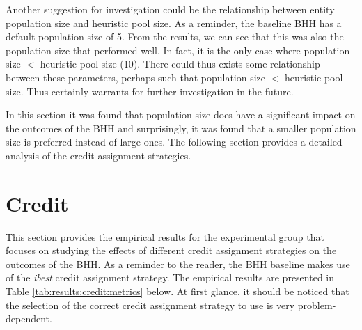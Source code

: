 Another suggestion for investigation could be the relationship between entity population size and heuristic pool size. As a reminder, the baseline \ac{BHH} has a default population size of 5. From the results, we can see that this was also the population size that performed well. In fact, it is the only case where population size $<$ heuristic pool size (10). There could thus exists some relationship between these parameters, perhaps such that population size $ < $ heuristic pool size. Thus certainly warrants for further investigation in the future.

In this section it was found that population size does have a significant impact on the outcomes of the \Ac{BHH} and surprisingly, it was found that a smaller population size is preferred instead of large ones. The following section provides a detailed analysis of the credit assignment strategies.




\section{Credit}
\label{sec:results:credit}

This section provides the empirical results for the experimental group that focuses on studying the effects of different credit assignment strategies on the outcomes of the \Ac{BHH}. As a reminder to the reader, the \Ac{BHH} baseline makes use of the \textit{ibest} credit assignment strategy. The empirical results are presented in Table \ref{tab:results:credit:metrics} below. At first glance, it should be noticed that the selection of the correct credit assignment strategy to use is very problem-dependent.

